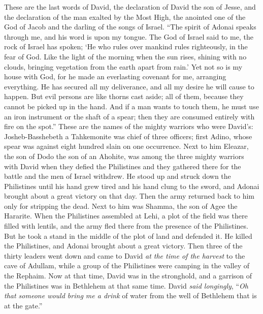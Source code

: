\begin{biblechapter} %
 These are the last words of David, the declaration of David the son of Jesse, and the declaration of the man exalted by the Most High, the anointed one of the God of Jacob and the darling of the songs of Israel.
\verse “The spirit of Adonai speaks through me, and his word is upon my tongue.
\verse The God of Israel said to me, the rock of Israel has spoken; ‘He who rules over mankind rules righteously, in the fear of God.
\verse Like the light of the morning when the sun rises, shining with no clouds, bringing vegetation from the earth apart from rain.’
\verse Yet not so is my house with God, for he made an everlasting covenant for me, arranging everything. He has secured all my deliverance, and all my desire he will cause to happen.
\verse But evil persons are like thorns cast aside; all of them, because they cannot be picked up in the hand.
\verse And if a man wants to touch them, he must use an iron instrument or the shaft of a spear; then they are consumed entirely with fire on the spot.”
 These are the names of the mighty warriors who were David’s: Josheb-Basshebeth a Tahkemonite was chief of three officers; first Adino, whose spear was against eight hundred slain on one occurrence.
\verse Next to him Eleazar, the son of Dodo the son of an Ahohite, was among the three mighty warriors with David when they defied the Philistines and they gathered there for the battle and the men of Israel withdrew.
\verse He stood up and struck down the Philistines until his hand grew tired and his hand clung to the sword, and Adonai brought about a great victory on that day. Then the army returned back to him only for stripping the dead.
\verse Next to him was Shamma, the son of Agee the Hararite. When the Philistines assembled at Lehi, a plot of the field was there filled with lentils, and the army fled there from the presence of the Philistines.
\verse But he took a stand in the middle of the plot of land and defended it. He killed the Philistines, and Adonai brought about a great victory.
\verse Then three of the thirty leaders went down and came to David \textit{at the time of the harvest} to the cave of Adullam, while a group of the Philistines were camping in the valley of the Rephaim.
\verse Now at that time, David was in the stronghold, and a garrison of the Philistines was in Bethlehem at that same time.
\verse David \textit{said longingly}, “\textit{Oh that someone would bring me a drink} of water from the well of Bethlehem that is at the gate.”

\end{biblechapter}
